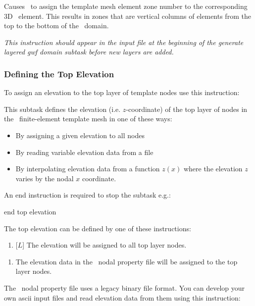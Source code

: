     {Causes \mut\ to assign the template mesh element zone number to the corresponding 3D \gwf\ element.  This results in zones that are vertical columns of elements from the top to the bottom of the \gwf\ domain.

    {\em This instruction should appear in the input file at the beginning of the \textsf{generate layered gwf domain} subtask before new layers are added.}
    }

\subsubsection{Defining the Top Elevation} \label{section:topelev}
To assign an elevation to the top layer of template nodes use this instruction:

    {This subtask defines the elevation (i.e. $z$-coordinate) of the top layer of nodes in the \gwf\ finite-element template mesh in one of these ways:
     \begin{itemize}
        \item By assigning a given elevation to all nodes
        \item By reading variable elevation data from a file
        \item By interpolating elevation data from a function $z(x)$ where the elevation $z$ varies by the nodal $x$ coordinate.
     \end{itemize}

    An end instruction is required to stop the subtask e.g.:

    {\Large \sf end top elevation}
    }

 The top elevation can be defined by one of these instructions: \label{'Page:TopElev'}

    {\squish
    \begin{enumerate}
    \item {} [$L$]  The elevation  will be assigned to all top layer nodes.
    \end{enumerate}
    }

    {\squish
    \begin{enumerate}
    \item {}  The elevation data in the \gb\ nodal property file  will be assigned to the top layer nodes.
    \end{enumerate}
    }

The \gb\ nodal property file uses a legacy binary file format. You can develop your own ascii input files and read elevation data from them using this instruction:

